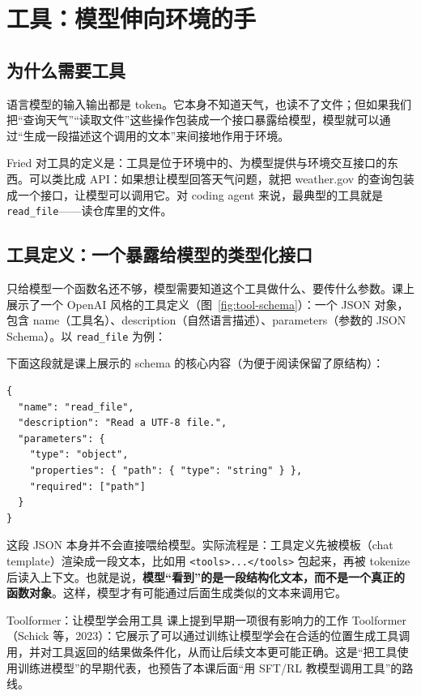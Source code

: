 \documentclass[a4paper]{article}
\begin{document}
\section{工具：模型伸向环境的手}

\subsection{为什么需要工具}

语言模型的输入输出都是 token。它本身不知道天气，也读不了文件；但如果我们把“查询天气”“读取文件”这些操作包装成一个接口暴露给模型，模型就可以通过“生成一段描述这个调用的文本”来间接地作用于环境。

Fried 对工具的定义是：工具是位于环境中的、为模型提供与环境交互接口的东西。可以类比成 API：如果想让模型回答天气问题，就把 weather.gov 的查询包装成一个接口，让模型可以调用它。对 coding agent 来说，最典型的工具就是 \texttt{read\_file}——读仓库里的文件。

\subsection{工具定义：一个暴露给模型的类型化接口}

只给模型一个函数名还不够，模型需要知道这个工具做什么、要传什么参数。课上展示了一个 OpenAI 风格的工具定义（图~\ref{fig:tool-schema}）：一个 JSON 对象，包含 name（工具名）、description（自然语言描述）、parameters（参数的 JSON Schema）。以 \texttt{read\_file} 为例：

下面这段就是课上展示的 schema 的核心内容（为便于阅读保留了原结构）：

\noindent\begin{minipage}{\linewidth}
\begin{lstlisting}[caption={工具定义：read\_file 的 JSON schema（按幻灯片内容整理）},label={lst:tool-schema}]
{
  "name": "read_file",
  "description": "Read a UTF-8 file.",
  "parameters": {
    "type": "object",
    "properties": { "path": { "type": "string" } },
    "required": ["path"]
  }
}
\end{lstlisting}
\end{minipage}

这段 JSON 本身并不会直接喂给模型。实际流程是：工具定义先被模板（chat template）渲染成一段文本，比如用 \texttt{<tools>...</tools>} 包起来，再被 tokenize 后读入上下文。也就是说，\textbf{模型“看到”的是一段结构化文本，而不是一个真正的函数对象}。这样，模型才有可能通过后面生成类似的文本来调用它。

\begin{knowledgebox}{Toolformer：让模型学会用工具}
课上提到早期一项很有影响力的工作 Toolformer（Schick 等，2023）：它展示了可以通过训练让模型学会在合适的位置生成工具调用，并对工具返回的结果做条件化，从而让后续文本更可能正确。这是“把工具使用训练进模型”的早期代表，也预告了本课后面“用 SFT/RL 教模型调用工具”的路线。
\end{knowledgebox}
\end{document}
